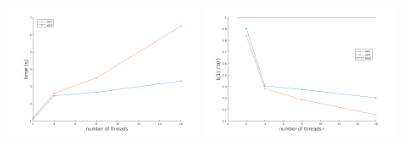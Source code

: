\documentclass{article}
\begin{document}
\begin{figure}
  \centering
  \includegraphics[width=0.45\textwidth]{./figures/weak_scalability.png} %
  \includegraphics[width=0.45\textwidth]{./figures/weak_scalability2.png} 
\end{figure}



\end{document}
